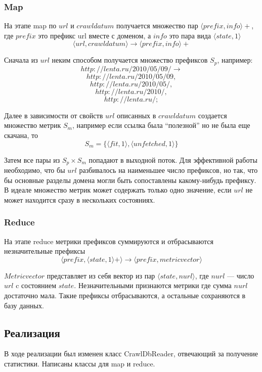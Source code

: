 \subsubsection{Map}
На этапе map по $url$ и $crawldatum$ получается множество пар $\langle prefix,info\rangle+$, где $prefix$ это префикс url вместе с доменом, а $info$ это пара вида $\langle state,1\rangle$
$$\langle url, crawldatum \rangle \rightarrow \langle prefix,info\rangle+ $$

Сначала из $url$ неким способом получается множество префиксов $S_{p}$, например:
$$ http://lenta.ru/2010/05/09/ \rightarrow $$
$$ http://lenta.ru/2010/05/09, $$
$$ http://lenta.ru/2010/05/, $$
$$ http://lenta.ru/2010/, $$
$$ http://lenta.ru/; $$


Далее в зависимости от свойств $url$ описанных в $crawldatum$ создается множество метрик $S_{m}$, например если ссылка была ``полезной'' но не была еще скачана, то $$ S_{m}=\{\langle fit,1\rangle, \langle unfetched,1\rangle\}$$

Затем все пары из $S_{p} \times S_{m}$ попадают в выходной поток. Для эффективной работы необходимо, что бы $url$ разбивалось на наименьшее число префиксов, но так, что бы основные разделы домена могли быть сопоставлены какому-нибудь префиксу. В идеале множество метрик может содержать только одно значение, если $url$ не может находится сразу в нескольких состояниях.
\subsubsection{Reduce}
На этапе reduce метрики префиксов суммируются и отбрасываются незначительные префиксы
$$\langle prefix,\langle state,1\rangle+\rangle \rightarrow \langle prefix,metricvector\rangle$$

$Metricvector$ представляет из себя вектор из пар $\langle state, nurl \rangle$, где $nurl$ --- число $url$ c состоянием $state$.
Незначительными признаются метрики где сумма $nurl$ достаточно мала. Такие префиксы отбрасываются, а остальные сохраняются в базу данных.

\subsection{Реализация}
В ходе реализации был изменен класс CrawlDbReader, отвечающий за получение статистики. Написаны классы для map и reduce.

